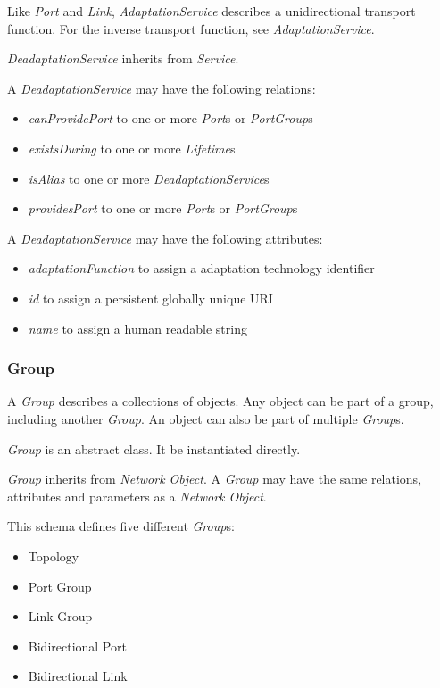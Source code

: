 Like \emph{Port} and \emph{Link}, \emph{AdaptationService} describes a unidirectional transport function. For the inverse transport function, see \emph{AdaptationService}.%

\emph{DeadaptationService} inherits from \emph{Service}.

A \emph{DeadaptationService} may have the following relations:
\begin{itemize}
    \item \emph{canProvidePort} to one or more \emph{Port}s or \emph{PortGroup}s
    \item \emph{existsDuring} to one or more \emph{Lifetime}s
    \item \emph{isAlias} to one or more \emph{DeadaptationService}s
    \item \emph{providesPort} to one or more \emph{Port}s or \emph{PortGroup}s
\end{itemize}

A \emph{DeadaptationService} may have the following attributes:
\begin{itemize}
    \item \emph{adaptationFunction} to assign a adaptation technology identifier
    \item \emph{id} to assign a persistent globally unique URI
    \item \emph{name} to assign a human readable string
\end{itemize}



\subsubsection{Group}%
\label{class:group}

A \emph{Group} describes a collections of objects. Any object can be part of a group, including another \emph{Group}. An object can also be part of multiple \emph{Group}s.

\emph{Group} is an abstract class. It \MUSTNOT{} be instantiated directly.

\emph{Group} inherits from \emph{Network Object}.
A \emph{Group} may have the same relations, attributes and parameters as a \emph{Network Object}.

This schema defines five different \emph{Group}s:

\begin{itemize}
    \item Topology
    \item Port Group
    \item Link Group
    \item Bidirectional Port
    \item Bidirectional Link
\end{itemize}

